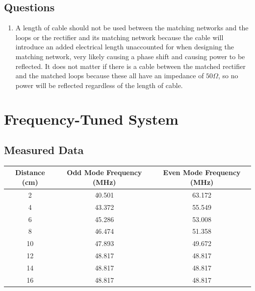 \documentclass{article}
\begin{document}
\subsection{Questions}

\begin{enumerate}
	\item A length of cable should not be used between the matching networks and the loops or the rectifier and its matching network because the cable will introduce an added electrical length unaccounted for when designing the matching network, very likely causing a phase shift and causing power to be reflected. It does not matter if there is a cable between the matched rectifier and the matched loops because these all have an impedance of $50 \Omega$, so no power will be reflected regardless of the length of cable.

\end{enumerate}


\section{Frequency-Tuned System}

\subsection{Measured Data}
\begin{table}[H]
\centering
\begin{tabular}{|c|c|c|}
\hline
Distance (cm) & Odd Mode Frequency (MHz) & Even Mode Frequency (MHz) \\ \hline
2             & 40.501                   & 63.172                    \\ \hline
4             & 43.372                   & 55.549                    \\ \hline
6             & 45.286                   & 53.008                    \\ \hline
8             & 46.474                   & 51.358                    \\ \hline
10            & 47.893                   & 49.672                    \\ \hline
12            & 48.817                   & 48.817                    \\ \hline
14            & 48.817                   & 48.817                    \\ \hline
16            & 48.817                   & 48.817                    \\ \hline
\end{tabular}
\end{table}
\end{document}
